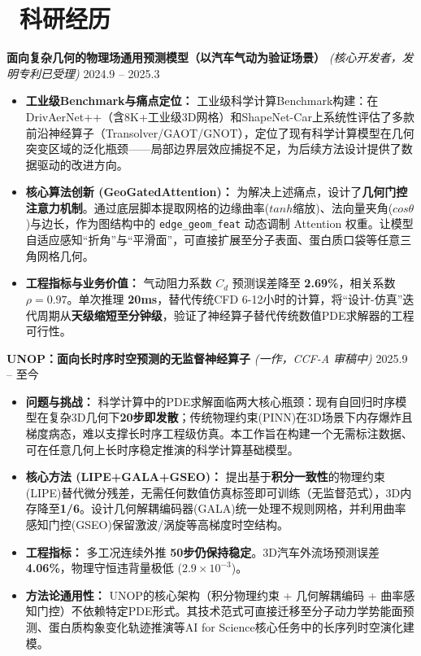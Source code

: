 \documentclass[11pt]{article}
\begin{document}

\section{\makebox[\widthof{\faUsers}][c]{\color{CVBlue}\faUsers}\ 
科研经历}
\textbf{面向复杂几何的物理场通用预测模型（以汽车气动为验证场景）} 
\textit{(核心开发者，发明专利已受理)} 
\hfill 2024.9 -- 2025.3
\begin{itemize}
    \item \textbf{工业级Benchmark与痛点定位：} 工业级科学计算Benchmark构建：在DrivAerNet++（含8K+工业级3D网格）和ShapeNet-Car上系统性评估了多款前沿神经算子（Transolver/GAOT/GNOT），定位了现有科学计算模型在几何突变区域的泛化瓶颈——局部边界层效应捕捉不足，为后续方法设计提供了数据驱动的改进方向。
    \item \textbf{核心算法创新 (GeoGatedAttention)：} 为解决上述痛点，设计了\textbf{几何门控注意力机制}。通过底层脚本提取网格的边缘曲率($tanh$缩放)、法向量夹角($cos\theta$)与边长，作为图结构中的 \texttt{edge\_geom\_feat} 动态调制 Attention 权重。让模型自适应感知“折角”与“平滑面”，可直接扩展至分子表面、蛋白质口袋等任意三角网格几何。
    \item \textbf{工程指标与业务价值：} 气动阻力系数 $C_d$ 预测误差降至 \textbf{2.69\%}，相关系数 $\rho = 0.97$。单次推理 \textbf{20ms}，替代传统CFD 6-12小时的计算，将“设计-仿真”迭代周期从\textbf{天级缩短至分钟级}，验证了神经算子替代传统数值PDE求解器的工程可行性。
\end{itemize}


\textbf{UNOP：面向长时序时空预测的无监督神经算子} 
\textit{(一作，CCF-A 审稿中)} 
\hfill 2025.9 -- 至今
\begin{itemize}
    \item \textbf{问题与挑战：} 科学计算中的PDE求解面临两大核心瓶颈：现有自回归时序模型在复杂3D几何下\textbf{20步即发散}；传统物理约束(PINN)在3D场景下内存爆炸且梯度病态，难以支撑长时序工程级仿真。本工作旨在构建一个无需标注数据、可在任意几何上长时序稳定推演的科学计算基础模型。
    \item \textbf{核心方法 (LIPE+GALA+GSEO)：} 提出基于\textbf{积分一致性}的物理约束(LIPE)替代微分残差，无需任何数值仿真标签即可训练（无监督范式），3D内存降至\textbf{1/6}。设计几何解耦编码器(GALA)统一处理不规则网格，并利用曲率感知门控(GSEO)保留激波/涡旋等高梯度时空结构。
    \item \textbf{工程指标：} 多工况连续外推 \textbf{50步仍保持稳定}。3D汽车外流场预测误差 \textbf{4.06\%}，物理守恒违背量极低 ($2.9\times10^{-3}$)。
    \item \textbf{方法论通用性：} UNOP的核心架构（积分物理约束 + 几何解耦编码 + 曲率感知门控）不依赖特定PDE形式。其技术范式可直接迁移至分子动力学势能面预测、蛋白质构象变化轨迹推演等AI for Science核心任务中的长序列时空演化建模。
\end{itemize}
\end{document}
